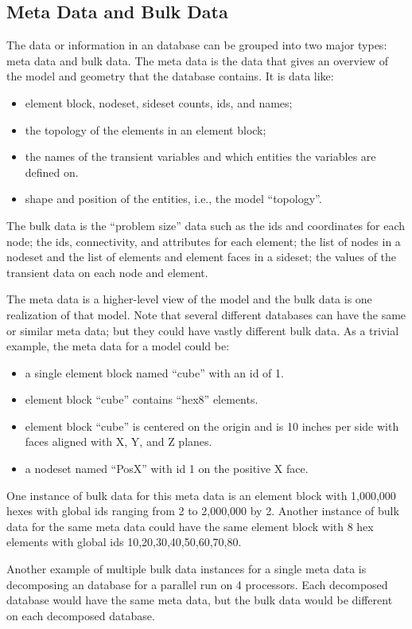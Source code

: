 \subsection{Meta Data and Bulk Data}
The data or information in an \exo{} database can be grouped into two
major types: meta data and bulk data.  The meta data is the data that
gives an overview of the model and geometry that the \exo{} database
contains. It is data like:
\begin{itemize}
\item element block, nodeset, sideset counts, ids, and names;
\item the topology of the elements in an element block;
\item the names of the transient variables and which entities the
	variables are defined on.
\item shape and position of the entities, i.e., the model ``topology''.
\end{itemize}

The bulk data is the ``problem size'' data such as the ids and
coordinates for each node; the ids, connectivity, and attributes for
each element; the list of nodes in a nodeset and the list of elements
and element faces in a sideset; the values of the transient data on
each node and element.

The meta data is a higher-level view of the model and the bulk data is
one realization of that model.  Note that several different databases
can have the same or similar meta data; but they could have vastly
different bulk data.  As a trivial example, the meta data for a model
could be:
\begin{itemize}
\item a single element block named ``cube'' with an id of 1.
\item element block ``cube'' contains ``hex8'' elements.
\item element block ``cube'' is centered on the origin and is 10
inches per side with faces aligned with X, Y, and Z planes.
\item a nodeset named ``PosX'' with id 1 on the positive X face.
\end{itemize}

One instance of bulk data for this meta data is an element block with
1,000,000 hexes with global ids ranging from 2 to 2,000,000 by 2.
Another instance of bulk data for the same meta data could have the
same element block with 8 hex elements with global ids
10,20,30,40,50,60,70,80.

Another example of multiple bulk data instances for a single meta data
is decomposing an \exo{} database for a parallel run on 4 processors.
Each decomposed database would have the same meta data, but the bulk
data would be different on each decomposed database.

